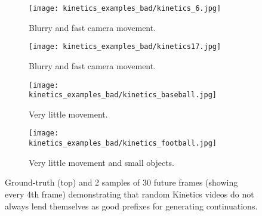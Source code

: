\documentclass{article} \usepackage{iclr2020_conference,times}
\begin{document}
\begin{figure}[p]
    \centering
    \begin{subfigure}{0.48\textwidth}
    \texttt{[image: kinetics\_examples\_bad/kinetics\_6.jpg]}
    \caption{Blurry and fast camera movement.}
    \end{subfigure}\quad
    \begin{subfigure}{0.48\textwidth}
    \texttt{[image: kinetics\_examples\_bad/kinetics17.jpg]}
    \caption{Blurry and fast camera movement.}
    \end{subfigure}
    \begin{subfigure}{0.48\textwidth}
    \texttt{[image: kinetics\_examples\_bad/kinetics\_baseball.jpg]}
    \caption{Very little movement.}
    \end{subfigure}\quad
    \begin{subfigure}{0.48\textwidth}
    \texttt{[image: kinetics\_examples\_bad/kinetics\_football.jpg]}
    \caption{Very little movement and small objects.}
    \end{subfigure}
    \caption{Ground-truth (top) and 2 samples of 30 future frames (showing every 4th frame) demonstrating that random Kinetics videos do not always lend themselves as good prefixes for generating continuations.}
    \label{fig:kinetics_prefixes}
\end{figure}
\end{document}
